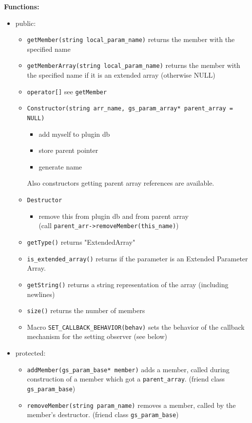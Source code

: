 {\bf Functions:}
\begin{itemize}
  \item public:
  \begin{itemize}
    \item \lstinline|getMember(string local_param_name)| returns the member with the specified name
    \item \lstinline|getMemberArray(string local_param_name)| returns the member with the specified name if it is an extended array (otherwise NULL)
    \item \lstinline|operator[]| see \lstinline|getMember|
    \item \lstinline|Constructor(string arr_name, gs_param_array* parent_array = NULL)|
    \begin{itemize}
          \item add myself to plugin db
          \item store parent pointer
          \item generate name
    \end{itemize}
    Also constructors getting parent array references are available.
    \item \lstinline|Destructor|
    \begin{itemize}
          \item remove this from plugin db and from parent array \\
          (call \lstinline|parent_arr->removeMember(this_name)|)
    \end{itemize}
    \item \lstinline|getType()| returns \textsf{"ExtendedArray"}
    \item \lstinline|is_extended_array()| returns if the parameter is an Extended Parameter Array.
    \item \lstinline|getString()| returns a string representation of the array (including newlines)
    \item \lstinline|size()| returns the number of members
    \item Macro \lstinline|SET_CALLBACK_BEHAVIOR(behav)| sets the behavior of the callback mechanism for the setting observer (see below)
  \end{itemize}

  \item protected:
  \begin{itemize}
    \item \lstinline|addMember(gs_param_base* member)| adds a member, called during construction of a member which got a \lstinline|parent_array|. (friend class \lstinline|gs_param_base|)
    \item \lstinline|removeMember(string param_name)| removes a member, called by the member's destructor. (friend class \lstinline|gs_param_base|)
  \end{itemize}
\end{itemize}

